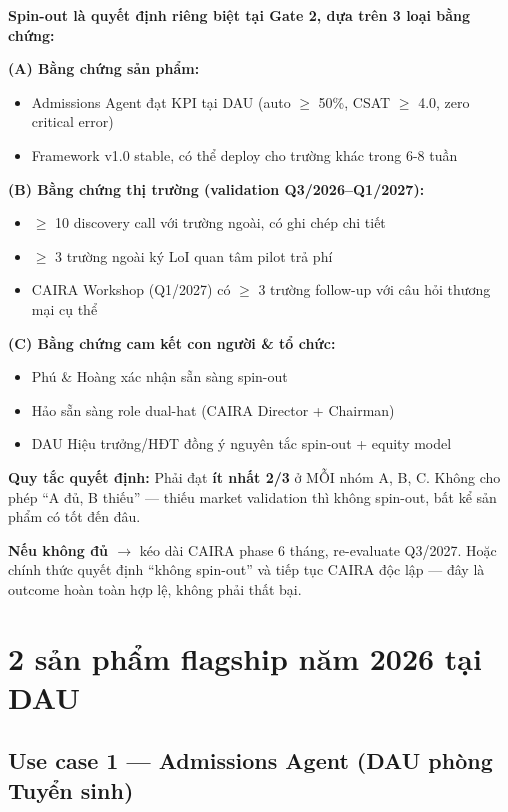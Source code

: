 \documentclass[11pt,a4paper]{article}
\begin{document}
\begin{keybox}[title=Tại cuối Q1/2027 --- Gate 2: Go/No-go spin-out]
\textbf{Spin-out là quyết định riêng biệt tại Gate 2, dựa trên 3 loại bằng chứng:}

\textbf{(A) Bằng chứng sản phẩm:}
\begin{itemize}
\item Admissions Agent đạt KPI tại DAU (auto $\geq$ 50\%, CSAT $\geq$ 4.0, zero critical error)
\item Framework v1.0 stable, có thể deploy cho trường khác trong 6-8 tuần
\end{itemize}
\textbf{(B) Bằng chứng thị trường (validation Q3/2026--Q1/2027):}
\begin{itemize}
\item $\geq$ 10 discovery call với trường ngoài, có ghi chép chi tiết
\item $\geq$ 3 trường ngoài ký LoI quan tâm pilot trả phí
\item CAIRA Workshop (Q1/2027) có $\geq$ 3 trường follow-up với câu hỏi thương mại cụ thể
\end{itemize}
\textbf{(C) Bằng chứng cam kết con người \& tổ chức:}
\begin{itemize}
\item Phú \& Hoàng xác nhận sẵn sàng spin-out
\item Hảo sẵn sàng role dual-hat (CAIRA Director + Chairman)
\item DAU Hiệu trưởng/HĐT đồng ý nguyên tắc spin-out + equity model
\end{itemize}

\textbf{Quy tắc quyết định:} Phải đạt \textbf{ít nhất 2/3} ở MỖI nhóm A, B, C.
Không cho phép ``A đủ, B thiếu'' --- thiếu market validation thì không spin-out,
bất kể sản phẩm có tốt đến đâu.

\textbf{Nếu không đủ $\to$} kéo dài CAIRA phase 6 tháng, re-evaluate Q3/2027.
Hoặc chính thức quyết định ``không spin-out'' và tiếp tục CAIRA độc lập --- đây
là outcome hoàn toàn hợp lệ, không phải thất bại.
\end{keybox}

\clearpage

\section{2 sản phẩm flagship năm 2026 tại DAU}

\subsection{Use case 1 — Admissions Agent (DAU phòng Tuyển sinh)}
\end{document}
